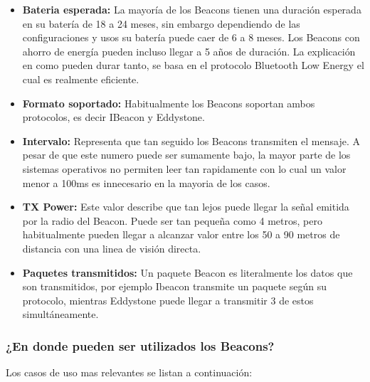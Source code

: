 \begin{itemize}
\item \textbf{Bateria esperada: } La mayoría de los Beacons tienen una duración esperada en su batería de 18 a 24 meses, sin embargo dependiendo de las configuraciones y usos su batería puede caer de 6 a 8 meses. Los Beacons con ahorro de energía pueden incluso llegar a 5 años de duración. La explicación en como pueden durar tanto, se basa en el protocolo Bluetooth Low Energy el cual es realmente eficiente.

\item \textbf{Formato soportado: } Habitualmente los Beacons soportan ambos protocolos, es decir IBeacon y Eddystone.

\item \textbf{Intervalo: } Representa que tan seguido los Beacons transmiten el mensaje. A pesar de que este numero puede ser sumamente bajo, la mayor parte de los sistemas operativos no permiten leer tan rapidamente con lo cual un valor menor a 100ms es innecesario en la mayoria de los casos.

\item \textbf{TX Power: } Este valor describe que tan lejos puede llegar la señal emitida por la radio del Beacon. Puede ser tan pequeña como 4 metros, pero habitualmente pueden llegar a alcanzar valor entre los 50 a 90 metros de distancia con una linea de visión directa.

\item \textbf{Paquetes transmitidos: } Un paquete Beacon es literalmente los datos que son transmitidos, por ejemplo Ibeacon transmite un paquete según su protocolo, mientras Eddystone puede llegar a transmitir 3 de estos simultáneamente.

\end{itemize}

\subsubsection{¿En donde pueden ser utilizados los Beacons?}

Los casos de uso mas relevantes se listan a continuación:

